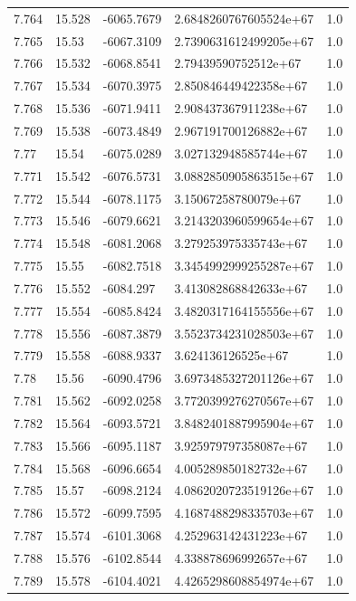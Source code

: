 \begin{tabular}{lllll}
7.764 & 15.528 & -6065.7679 & 2.6848260767605524e+67 & 1.0 \\
7.765 & 15.53 & -6067.3109 & 2.7390631612499205e+67 & 1.0 \\
7.766 & 15.532 & -6068.8541 & 2.79439590752512e+67 & 1.0 \\
7.767 & 15.534 & -6070.3975 & 2.850846449422358e+67 & 1.0 \\
7.768 & 15.536 & -6071.9411 & 2.908437367911238e+67 & 1.0 \\
7.769 & 15.538 & -6073.4849 & 2.967191700126882e+67 & 1.0 \\
7.77 & 15.54 & -6075.0289 & 3.027132948585744e+67 & 1.0 \\
7.771 & 15.542 & -6076.5731 & 3.0882850905863515e+67 & 1.0 \\
7.772 & 15.544 & -6078.1175 & 3.15067258780079e+67 & 1.0 \\
7.773 & 15.546 & -6079.6621 & 3.2143203960599654e+67 & 1.0 \\
7.774 & 15.548 & -6081.2068 & 3.279253975335743e+67 & 1.0 \\
7.775 & 15.55 & -6082.7518 & 3.3454992999255287e+67 & 1.0 \\
7.776 & 15.552 & -6084.297 & 3.413082868842633e+67 & 1.0 \\
7.777 & 15.554 & -6085.8424 & 3.4820317164155556e+67 & 1.0 \\
7.778 & 15.556 & -6087.3879 & 3.5523734231028503e+67 & 1.0 \\
7.779 & 15.558 & -6088.9337 & 3.624136126525e+67 & 1.0 \\
7.78 & 15.56 & -6090.4796 & 3.6973485327201126e+67 & 1.0 \\
7.781 & 15.562 & -6092.0258 & 3.7720399276270567e+67 & 1.0 \\
7.782 & 15.564 & -6093.5721 & 3.8482401887995904e+67 & 1.0 \\
7.783 & 15.566 & -6095.1187 & 3.925979797358087e+67 & 1.0 \\
7.784 & 15.568 & -6096.6654 & 4.005289850182732e+67 & 1.0 \\
7.785 & 15.57 & -6098.2124 & 4.0862020723519126e+67 & 1.0 \\
7.786 & 15.572 & -6099.7595 & 4.1687488298335703e+67 & 1.0 \\
7.787 & 15.574 & -6101.3068 & 4.252963142431223e+67 & 1.0 \\
7.788 & 15.576 & -6102.8544 & 4.338878696992657e+67 & 1.0 \\
7.789 & 15.578 & -6104.4021 & 4.4265298608854974e+67 & 1.0 \\

\end{tabular}
